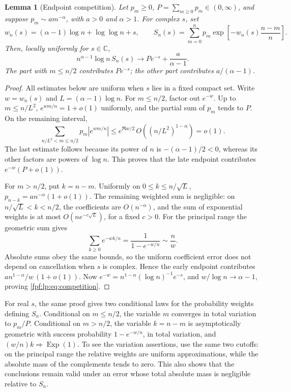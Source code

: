 \documentclass[11pt]{article}
\numberwithin{equation}{section}
\newtheorem{lemma}[theorem]{Lemma}
\theoremstyle{definition}
\newcommand{\Exp}{\operatorname{Exp}}
\begin{document}
\begin{lemma}[Endpoint competition]\label{fpf:lp:lem:competition}
Let \(p_m\ge0\), \(P=\sum_{m\ge0}p_m\in(0,\infty)\), and suppose
\(p_m\sim a m^{-\alpha}\), with \(a>0\) and \(\alpha>1\). For
complex \(s\), set
\[
 w_n(s)=(\alpha-1)\log n+\log\log n+s,
 \qquad
 S_n(s)=\sum_{m=0}^np_m
             \exp\!\left[-w_n(s)\frac{n-m}{n}\right].
\]
Then, locally uniformly for \(s\in\mathbb C\),
\begin{equation}\label{fpf:lp:eq:competition}
 n^{\alpha-1}\log n\,S_n(s)
 \longrightarrow Pe^{-s}+\frac a{\alpha-1}.
\end{equation}
The part with \(m\le n/2\) contributes \(Pe^{-s}\); the other part
contributes \(a/(\alpha-1)\).
\end{lemma}
\begin{proof}
All estimates below are uniform when \(s\) lies in a fixed compact
set. Write \(w=w_n(s)\) and \(L=(\alpha-1)\log n\).
For \(m\le n/2\), factor out \(e^{-w}\). Up to \(m\le n/L^2\),
\(e^{wm/n}=1+o(1)\) uniformly, and the partial sum of \(p_m\) tends
to \(P\). On the remaining interval,
\[
 \sum_{n/L^2<m\le n/2}p_m|e^{wm/n}|
 \le e^{\Re w/2}\,O((n/L^2)^{1-\alpha})=o(1).
\]
The last estimate follows because its power of \(n\) is
\(- (\alpha-1)/2<0\), whereas its other factors are powers of
\(\log n\). This proves that the late endpoint contributes
\(e^{-w}(P+o(1))\).

For \(m>n/2\), put \(k=n-m\). Uniformly on
\(0\le k\le n/\sqrt L\),
\(p_{n-k}=a n^{-\alpha}(1+o(1))\). The remaining weighted sum is
negligible: on \(n/\sqrt L<k<n/2\), the coefficients are
\(O(n^{-\alpha})\), and the sum of exponential weights is at most
\(O(n e^{-c\sqrt L})\), for a fixed \(c>0\).
For the principal range the geometric sum gives
\[
 \sum_{k\ge0}e^{-wk/n}
 =\frac1{1-e^{-w/n}}\sim\frac n w.
\]
Absolute sums obey the same bounds, so the uniform coefficient error
does not depend on cancellation when \(s\) is complex. Hence the
early endpoint contributes \(a n^{1-\alpha}/w\,(1+o(1))\).
Now \(e^{-w}=n^{1-\alpha}(\log n)^{-1}e^{-s}\), and
\(w/\log n\to\alpha-1\), proving \eqref{fpf:lp:eq:competition}.
\end{proof}

For real \(s\), the same proof gives two conditional laws for the
probability weights defining \(S_n\). Conditional on \(m\le n/2\),
the variable \(m\) converges in total variation to \(p_m/P\).
Conditional on \(m>n/2\), the variable \(k=n-m\) is asymptotically
geometric with success probability \(1-e^{-w/n}\), in total variation, and
\((w/n)k\Rightarrow\Exp(1)\). To see the variation assertions,
use the same two cutoffs: on the principal range the relative weights
are uniform approximations, while the absolute mass of the complements
tends to zero. This also shows that the conclusions remain valid under
an error whose total absolute mass is negligible relative to \(S_n\).
\end{document}
